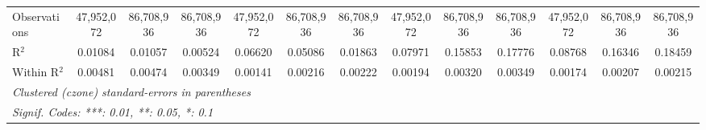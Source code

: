 \begin{tabular}{lcccccccccccc}
   Observations                            & 47,952,072    & 86,708,936            & 86,708,936          & 47,952,072    & 86,708,936            & 86,708,936          & 47,952,072    & 86,708,936            & 86,708,936          & 47,952,072    & 86,708,936            & 86,708,936\\  
   R$^2$                                   & 0.01084       & 0.01057               & 0.00524             & 0.06620       & 0.05086               & 0.01863             & 0.07971       & 0.15853               & 0.17776             & 0.08768       & 0.16346               & 0.18459\\  
   Within R$^2$                            & 0.00481       & 0.00474               & 0.00349             & 0.00141       & 0.00216               & 0.00222             & 0.00194       & 0.00320               & 0.00349             & 0.00174       & 0.00207               & 0.00215\\  
   \midrule \midrule
   \multicolumn{13}{l}{\emph{Clustered (czone) standard-errors in parentheses}}\\
   \multicolumn{13}{l}{\emph{Signif. Codes: ***: 0.01, **: 0.05, *: 0.1}}\\
\end{tabular}
\par\endgroup


